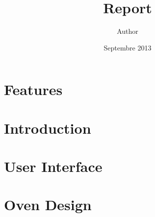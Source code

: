 \documentclass[11pt, twocolumn]{article}
\title{Report}
\author{Author}
\date{Septembre 2013}
\begin{document}
\maketitle

\section*{Features}

\section*{Introduction}

\section{User Interface}

\section{Oven Design}
\end{document}
